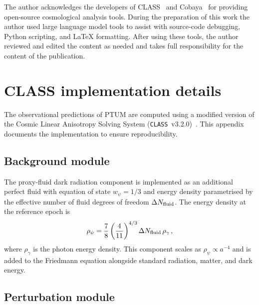 \documentclass[epj]{svjour}
\begin{document}
\begin{acknowledgement}
The author acknowledges the developers of
CLASS~\cite{Blas2011,Lesgourgues2011} and
Cobaya~\cite{Torrado2021} for providing open-source cosmological
analysis tools. During the preparation of this work the author used
large language model tools to assist with source-code debugging,
Python scripting, and \LaTeX{} formatting. After using these tools,
the author reviewed and edited the content as needed and takes full
responsibility for the content of the publication.
\end{acknowledgement}


\appendix

\appendix

\section{CLASS implementation details}
\label{app:class}

The observational predictions of PTUM are computed using a modified
version of the Cosmic Linear Anisotropy Solving System
(\texttt{CLASS}~v3.2.0)~\cite{Blas2011}. This appendix documents
the implementation to ensure reproducibility.

\subsection{Background module}

The proxy-fluid dark radiation component is implemented as an
additional perfect fluid with equation of state $w_\psi=1/3$ and
energy density parametrised by the effective number of fluid
degrees of freedom $\Delta N_{\rm fluid}$. The energy density at
the reference epoch is
\begin{equation}
\rho_\psi
= \frac{7}{8}\left(\frac{4}{11}\right)^{4/3}
  \Delta N_{\rm fluid}\,\rho_\gamma\,,
\label{eq:rho_pfd_app}
\end{equation}
where $\rho_\gamma$ is the photon energy density. This component
scales as $\rho_\psi\propto a^{-4}$ and is added to the Friedmann
equation alongside standard radiation, matter, and dark energy.

\subsection{Perturbation module}
\end{document}
